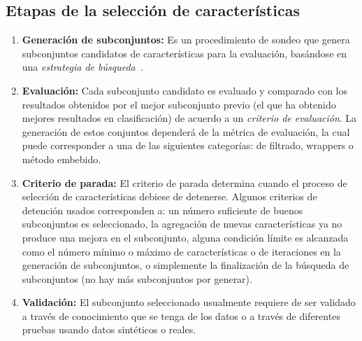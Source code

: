 \subsection{Etapas de la selecci\'on de caracter\'isticas}
\begin{enumerate}
\item \textbf{Generaci\'on de subconjuntos:} Es un procedimiento de sondeo que genera subconjuntos candidatos de caracter\'isticas para la evaluaci\'on, bas\'andose en una \textit{estrategia de b\'usqueda}~\cite{liuyu}. 
\item \textbf{Evaluaci\'on:} Cada subconjunto candidato es evaluado y comparado con los resultados obtenidos por el mejor subconjunto previo (el que ha obtenido mejores resultados en clasificaci\'on) de acuerdo a un \textit{criterio de evaluaci\'on}. La generaci\'on de estos conjuntos depender\'a de la m\'etrica de evaluaci\'on, la cual puede corresponder a una de las siguientes categor\'ias: de filtrado, wrappers o m\'etodo embebido.
\item \textbf{Criterio de parada:} El criterio de parada determina cuando el proceso de selecci\'on de caracter\'isticas debiese de detenerse. Algunos criterios de detenci\'on usados corresponden a: un n\'umero suficiente de buenos subconjuntos es seleccionado, la agregaci\'on de nuevas caracter\'isticas ya no produce una mejora en el subconjunto, alguna condici\'on l\'imite es alcanzada como el n\'umero m\'inimo o m\'aximo de caracter\'isticas o de iteraciones en la generaci\'on de subconjuntos, o simplemente la finalizaci\'on de la b\'usqueda de subconjuntos (no hay m\'as subconjuntos por generar).
\item \textbf{Validaci\'on:} El subconjunto seleccionado usualmente requiere de ser validado a trav\'es de conocimiento que se tenga de los datos o a trav\'es de diferentes pruebas usando datos sint\'eticos o reales.
\end{enumerate}
